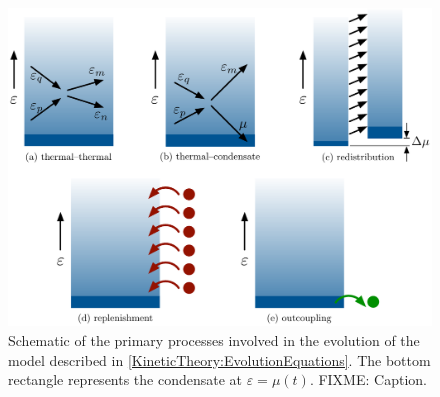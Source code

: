 \begin{figure}
    \centering
    \includegraphics[width=14cm]{ProcessDiagrams}
    \caption{Schematic of the primary processes involved in the evolution of the model described in \eqref{KineticTheory:EvolutionEquations}. The bottom rectangle represents the condensate at $\varepsilon = \mu(t)$. FIXME: Caption.}
    \label{KineticTheory:ProcessDiagrams}
\end{figure}

